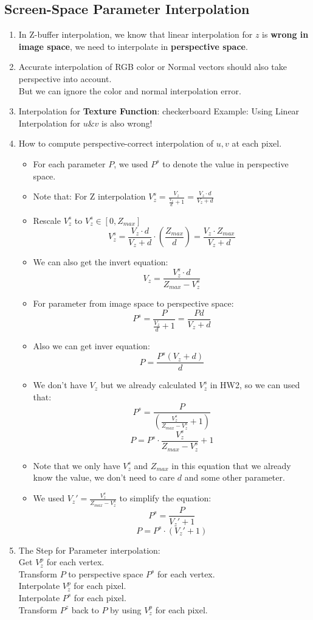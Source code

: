 \documentclass[geye,cyan,normal,en]{elegantnote}
\begin{document}
\subsection{Screen-Space Parameter Interpolation}
\begin{enumerate}
	\item In Z-buffer interpolation, we know that linear interpolation for $z$ is \textbf{wrong in image space}, we need to interpolate in \textbf{perspective space}.
	\item Accurate interpolation of RGB color or Normal vectors should also take perspective into account.\\
	But we can ignore the color and normal interpolation error.
	\item Interpolation for \textbf{Texture Function}: checkerboard Example: Using Linear Interpolation for $u\&v$ is also wrong!
	\item How to compute perspective-correct interpolation of $u,v$ at each pixel.
	\begin{itemize}
		\item For each parameter $P$, we used $P^s$ to denote the value in perspective space.
		\item Note that: For Z interpolation $V_z^s=\frac{V_z}{\frac{V_z}{d}+1}=\frac{V_z \cdot d}{V_z+d}$
		\item Rescale $V_z^s$ to $V_z^s \in [0,Z_{max}]$ 
		$$V_z^s=\frac{V_z \cdot d}{V_z+d} \cdot (\frac{Z_{max}}{d})=\frac{V_z \cdot Z_{max}}{V_z+d}$$
		\item We can also get the invert equation:
		$$V_z=\frac{V_z^s \cdot d}{Z_{max} - V_z^s}$$
		\item For parameter from image space to perspective space:
		$$P^s=\frac{P}{\frac{V_z}{d}+1}=\frac{Pd}{V_z+d}$$
		\item Also we can get inver equation:
		$$P=\frac{P^s(V_z+d)}{d}$$
		\item We don't have $V_z$ but we already calculated $V_z^s$ in HW2, so we can used that:
		$$P^s=\frac{P}{(\frac{V_z^s}{Z_{max} - V_z^s}+1)}$$
		$$P=P^s \cdot \frac{V_z^s}{Z_{max} - V_z^s}+1$$
		\item Note that we only have $V_z^s$ and $Z_{max}$ in this equation that we already know the value, we don't need to care $d$ and some other parameter.
		\item We used $V_z' = \frac{V_z^s}{Z_{max} - V_z^s}$ to simplify the equation:
		$$P^s=\frac{P}{V_z' +1}$$
		$$P=P^s \cdot(V_z'+1)$$
	\end{itemize}
	\item The Step for Parameter interpolation:\\
	Get $V_z^p$ for each vertex.\\
	Transform $P$ to perspective space $P^s$ for each vertex.\\
	Interpolate $V_z^p$ for each pixel.\\
	Interpolate $P^s$ for each pixel. \\
	Transform $P^z$ back to $P$ by using $V_z^p$ for each pixel.
\end{enumerate}
\newpage
\end{document}
